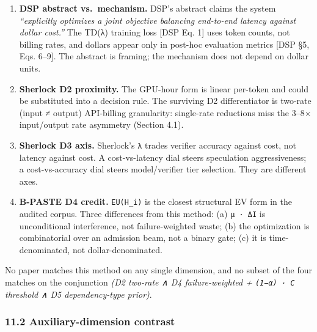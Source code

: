 \documentclass[
  11pt,
]{article}
\providecommand{\tightlist}{%
  \setlength{\itemsep}{0pt}\setlength{\parskip}{0pt}}
\begin{document}
\begin{enumerate}
\def\labelenumi{\arabic{enumi}.}
\tightlist
\item
  \textbf{DSP abstract vs.~mechanism.} DSP's abstract claims the system
  \emph{``explicitly optimizes a joint objective balancing end-to-end
  latency against dollar cost.''} The TD(λ) training loss {[}DSP Eq.
  1{]} uses token counts, not billing rates, and dollars appear only in
  post-hoc evaluation metrics {[}DSP §5, Eqs. 6--9{]}. The abstract is
  framing; the mechanism does not depend on dollar units.
\item
  \textbf{Sherlock D2 proximity.} The GPU-hour form is linear per-token
  and could be substituted into a decision rule. The surviving D2
  differentiator is two-rate (input ≠ output) API-billing granularity:
  single-rate reductions miss the 3--8× input/output rate asymmetry
  (Section 4.1).
\item
  \textbf{Sherlock D3 axis.} Sherlock's \texttt{λ} trades verifier
  accuracy against cost, not latency against cost. A cost-vs-latency
  dial steers speculation aggressiveness; a cost-vs-accuracy dial steers
  model/verifier tier selection. They are different axes.
\item
  \textbf{B-PASTE D4 credit.} \texttt{EU(H\_i)} is the closest
  structural EV form in the audited corpus. Three differences from this
  method: (a) \texttt{µ\ ·\ ΔI} is unconditional interference, not
  failure-weighted waste; (b) the optimization is combinatorial over an
  admission beam, not a binary gate; (c) it is time-denominated, not
  dollar-denominated.
\end{enumerate}

No paper matches this method on any single dimension, and no subset of
the four matches on the conjunction \emph{(D2 two-rate ∧ D4
failure-weighted + \texttt{(1−α)\ ·\ C} threshold ∧ D5 dependency-type
prior)}.

\subsubsection{11.2 Auxiliary-dimension
contrast}\label{auxiliary-dimension-contrast}
\end{document}
